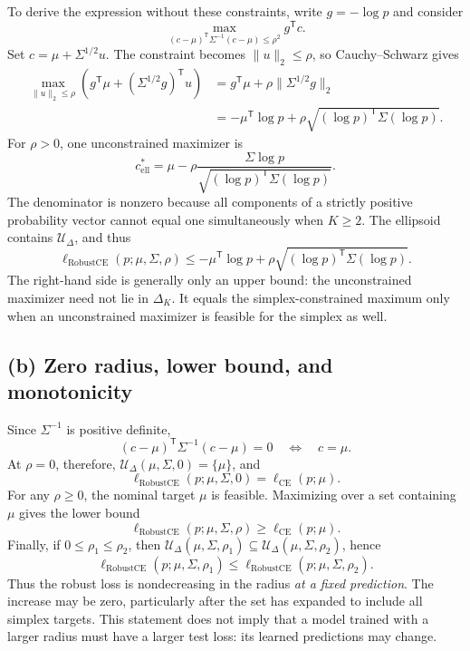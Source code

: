 \documentclass[11pt,a4paper]{article}
\newcommand{\CE}{\mathrm{CE}}
\newcommand{\RCE}{\mathrm{RobustCE}}
\newcommand{\UU}{\mathcal{U}_{\Delta}}
\begin{document}
To derive the expression without these constraints, write $g=-\log p$ and
consider
\begin{equation}
    \max_{(c-\mu)^{\mathsf T}\Sigma^{-1}(c-\mu)\leq\rho^2}
    g^{\mathsf T}c.
\end{equation}
Set $c=\mu+\Sigma^{1/2}u$. The constraint becomes $\lVert u\rVert_2\leq\rho$,
so Cauchy--Schwarz gives
\begin{align}
    \max_{\lVert u\rVert_2\leq\rho}
    \left(g^{\mathsf T}\mu+(\Sigma^{1/2}g)^{\mathsf T}u\right)
      &=g^{\mathsf T}\mu+\rho\lVert\Sigma^{1/2}g\rVert_2\\
      &=-\mu^{\mathsf T}\log p
          +\rho\sqrt{(\log p)^{\mathsf T}\Sigma(\log p)}.
\end{align}
For $\rho>0$, one unconstrained maximizer is
\begin{equation}
    c_{\mathrm{ell}}^*
      =\mu-\rho\frac{\Sigma\log p}
                   {\sqrt{(\log p)^{\mathsf T}\Sigma(\log p)}}.
\end{equation}
The denominator is nonzero because all components of a strictly positive
probability vector cannot equal one simultaneously when $K\geq2$.
The ellipsoid contains $\UU$, and thus
\begin{equation}
    \ell_{\RCE}(p;\mu,\Sigma,\rho)
    \leq -\mu^{\mathsf T}\log p
          +\rho\sqrt{(\log p)^{\mathsf T}\Sigma(\log p)}.
\end{equation}
The right-hand side is generally only an upper bound: the unconstrained
maximizer need not lie in $\Delta_K$. It equals the simplex-constrained maximum
only when an unconstrained maximizer is feasible for the simplex as well.

\subsection*{(b) Zero radius, lower bound, and monotonicity}
Since $\Sigma^{-1}$ is positive definite,
\begin{equation}
    (c-\mu)^{\mathsf T}\Sigma^{-1}(c-\mu)=0
    \quad\Longleftrightarrow\quad c=\mu.
\end{equation}
At $\rho=0$, therefore, $\UU(\mu,\Sigma,0)=\{\mu\}$, and
\begin{equation}
    \boxed{\ell_{\RCE}(p;\mu,\Sigma,0)=\ell_{\CE}(p;\mu).}
\end{equation}
For any $\rho\geq0$, the nominal target $\mu$ is feasible. Maximizing over a
set containing $\mu$ gives the lower bound
\begin{equation}
    \boxed{\ell_{\RCE}(p;\mu,\Sigma,\rho)\geq\ell_{\CE}(p;\mu).}
\end{equation}
Finally, if $0\leq\rho_1\leq\rho_2$, then
$\UU(\mu,\Sigma,\rho_1)\subseteq\UU(\mu,\Sigma,\rho_2)$, hence
\begin{equation}
    \ell_{\RCE}(p;\mu,\Sigma,\rho_1)
    \leq\ell_{\RCE}(p;\mu,\Sigma,\rho_2).
\end{equation}
Thus the robust loss is nondecreasing in the radius \emph{at a fixed prediction}.
The increase may be zero, particularly after the set has expanded to include
all simplex targets. This statement does not imply that a model trained with a
larger radius must have a larger test loss: its learned predictions may change.
\end{document}
